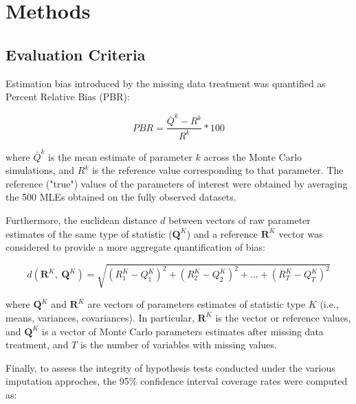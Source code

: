 \maketitle
\section{Methods}







\subsection{Evaluation Criteria}

Estimation bias introduced by the missing data treatment was quantified as Percent Relative Bias (PBR):

\begin{equation}
	PBR = \frac{\bar{Q}^{k} - R^{k} }{R^{k}}*100 \label{eq:bias_p}
\end{equation}

where $\bar{Q}^{k}$ is the mean estimate of parameter $k$ across the Monte Carlo simulations, and $R^{k}$ is the 
reference value corresponding to that parameter. The reference ("true") values of the parameters of interest were 
obtained by averaging the 500 MLEs obtained on the fully observed datasets. 

Furthermore, the euclidean distance $d$ between vectors of raw parameter estimates of the same type of statistic 
($\bm{Q}^{K}$) and a reference $\bm{R}^{K}$ vector was considered to provide a more aggregate quantification of bias:

\begin{equation}
	d(\bm{R}^{K}, \: \bm{Q}^{K}) = 
		\sqrt{ 
			(R^{K}_{1} - Q^{K}_{1})^{2} + 
			(R^{K}_{2} - Q^{K}_{2})^{2} + 
			... + 
			(R^{K}_{T} - Q^{K}_{T})^{2}
		} 
			\label{eq:eu_dist}
\end{equation}

where $\bm{Q}^{K}$ and $\bm{R}^{K}$ are vectors of parameters estimates of statistic type $K$ (i.e., means, variances, covariances). 
In particular, $\bm{R}^{K}$ is the vector or reference values, and $\bm{Q}^{K}$ is a vector of Monte Carlo parameters estimates after 
missing data treatment, and $T$ is the number of variables with missing values.

Finally, to assess the integrity of hypothesis tests conducted under the various imputation approches, the 95\% confidence 
interval coverage rates were computed as:

